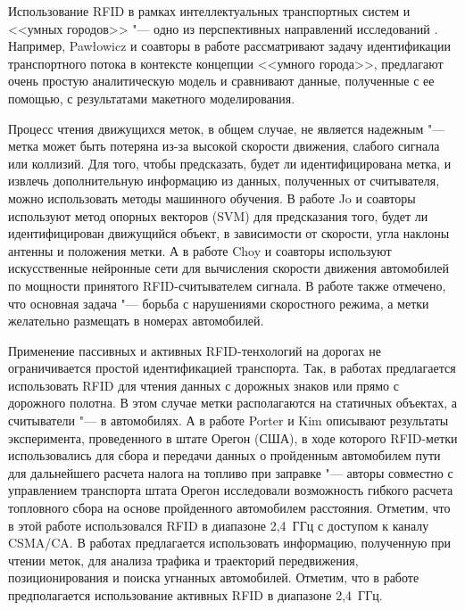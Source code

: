 Использование RFID в рамках интеллектуальных транспортных систем и <<умных городов>> "--- одно из перспективных направлений исследований \cite{Pawowicz2020, Pandit2009, Sundar2015}. Например, Pawłowicz и соавторы в работе \cite{Pawowicz2020} рассматривают задачу идентификации транспортного потока в контексте концепции <<умного города>>, предлагают очень простую аналитическую модель и сравнивают данные, полученные с ее помощью, с результатами макетного моделирования. 

Процесс чтения движущихся меток, в общем случае, не является надежным "--- метка может быть потеряна из-за высокой скорости движения, слабого сигнала или коллизий. Для того, чтобы предсказать, будет ли идентифицирована метка, и извлечь дополнительную информацию из данных, полученных от считывателя, можно использовать методы машинного обучения. В работе \cite{Jo2009} Jo и соавторы используют метод опорных векторов (SVM) для предсказания того, будет ли идентифицирован движущийся объект, в зависимости от скорости, угла наклоны антенны и положения метки. А в работе \cite{Choy2020} Choy и соавторы используют искусственные нейронные сети для вычисления скорости движения автомобилей по мощности принятого RFID-считывателем сигнала. В работе также отмечено, что основная задача "--- борьба с нарушениями скоростного режима, а метки желательно размещать в номерах автомобилей.

Применение пассивных и активных RFID-тенхологий на дорогах не ограничивается простой идентификацией транспорта. Так, в работах \cite{GarciaOya2018, Jing2016, Hidalgo2013, Jing2013, Cheng2012, Perez2010} предлагается использовать RFID для чтения данных с дорожных знаков или прямо с дорожного полотна. В этом случае метки располагаются на статичных объектах, а считыватели "--- в автомобилях. А в работе \cite{Porter2008} Porter и Kim описывают результаты эксперимента, проведенного в штате Орегон (США), в ходе которого RFID-метки использовались для сбора и передачи данных о пройденным автомобилем пути для дальнейшего расчета налога на топливо при заправке "--- авторы совместно с управлением транспорта штата Орегон исследовали возможность гибкого расчета топловного сбора на основе пройденного автомобилем расстояния. Отметим, что в этой работе использовался RFID в диапазоне 2,4~ГГц с доступом к каналу CSMA/CA. В работах \cite{Zheng2020, HongziZhu2009, Pandit2009} предлагается использовать информацию, полученную при чтении меток, для анализа трафика и траекторий передвижения, позиционирования и поиска угнанных автомобилей. Отметим, что в работе \cite{HongziZhu2009} предполагается использование активных RFID в диапазоне 2,4~ГГц.

